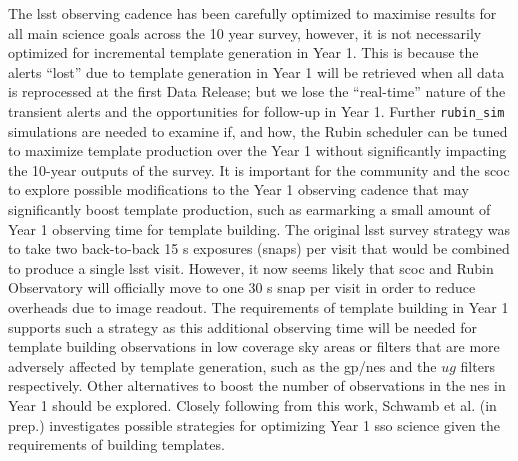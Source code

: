 \documentclass[preprintm,linenumbers]{aastex631}
\newcommand{\rubinsim}{\texttt{rubin\_sim}\xspace}
\begin{document}
The \gls*{lsst} observing cadence has been carefully optimized to maximise results for all main science goals across the 10 year survey, however, it is not necessarily optimized for incremental template generation in Year 1.
  This is because the alerts ``lost'' due to template generation in Year 1 will be retrieved when all data is reprocessed at the first Data Release; but we lose the ``real-time'' nature of the transient alerts and the opportunities for follow-up in Year 1.
		Further \rubinsim simulations are needed to examine if, and how, the Rubin scheduler can be tuned to maximize template production over the Year 1 without significantly impacting the 10-year outputs of the survey. 
  It is important for the community and the \gls*{scoc} to explore possible modifications to the Year 1 observing cadence  that may significantly boost template production, such as earmarking a small amount of Year 1 observing time for template building. 
The original \gls*{lsst} survey strategy was to take two back-to-back 15 s exposures (snaps) per visit that would be combined to produce a single \gls*{lsst} visit.
  However, it now seems likely that \gls*{scoc} and Rubin Observatory will officially move to one 30 s snap per visit in order to reduce overheads due to image readout. 
 The requirements of template building in Year 1 supports such a strategy as this additional observing time will be needed for template building observations in low coverage sky areas or filters that are more adversely affected by template generation, such as the \gls*{gp}/\gls*{nes} and the $ug$ filters respectively.
Other alternatives to boost the number of observations in the \gls*{nes} in Year 1 should be explored. 
Closely following from this work, Schwamb et al. (in prep.) investigates possible strategies for optimizing Year 1 \gls*{sso} science given the requirements of building templates.
\end{document}
